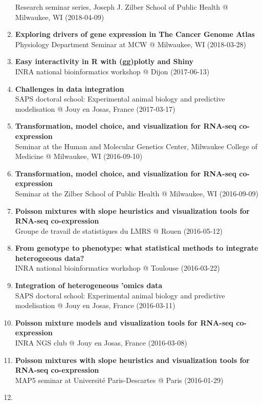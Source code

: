 \documentclass[11pt, a4paper]{awesome-cv}
\begin{document}
\begin{enumerate}
  Research seminar series, Joseph J. Zilber School of Public Health @
  Milwaukee, WI (2018-04-09)
\item
  \textbf{Exploring drivers of gene expression in The Cancer Genome
  Atlas}\\
  Physiology Department Seminar at MCW @ Milwaukee, WI (2018-03-28)
\item
  \textbf{Easy interactivity in R with (gg)plotly and Shiny}\\
  INRA national bioinformatics workshop @ Dijon (2017-06-13)
\item
  \textbf{Challenges in data integration}\\
  SAPS doctoral school: Experimental animal biology and predictive
  modelisation @ Jouy en Josas, France (2017-03-17)
\item
  \textbf{Transformation, model choice, and visualization for RNA-seq
  co-expression}\\
  Seminar at the Human and Molecular Genetics Center, Milwaukee College
  of Medicine @ Milwaukee, WI (2016-09-10)
\item
  \textbf{Transformation, model choice, and visualization for RNA-seq
  co-expression}\\
  Seminar at the Zilber School of Public Health @ Milwaukee, WI
  (2016-09-09)
\item
  \textbf{Poisson mixtures with slope heuristics and visualization tools
  for RNA-seq co-expression}\\
  Groupe de travail de statistiques du LMRS @ Rouen (2016-05-12)
\item
  \textbf{From genotype to phenotype: what statistical methods to
  integrate heterogeeous data?}\\
  INRA national bioinformatics workshop @ Toulouse (2016-03-22)
\item
  \textbf{Integration of heterogeneous 'omics data}\\
  SAPS doctoral school: Experimental animal biology and predictive
  modelisation @ Jouy en Josas, France (2016-03-11)
\item
  \textbf{Poisson mixture models and visualization tools for RNA-seq
  co-expression}\\
  INRA NGS club @ Jouy en Josas, France (2016-03-08)
\item
  \textbf{Poisson mixtures with slope heuristics and visualization tools
  for RNA-seq co-expression}\\
  MAP5 seminar at Université Paris-Descartes @ Paris (2016-01-29)
\item

\end{enumerate}
\end{document}
